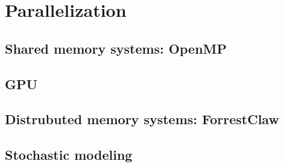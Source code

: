 \chapter{Parallelization}\label{ChapParallel}
\section{Shared memory systems: OpenMP}\label{ChapParallelSecOpenMP}
\section{GPU}\label{ChapParallelSecGPU}
\section{Distrubuted memory systems: ForrestClaw}\label{ChapParallelSecForrest}
\section{Stochastic modeling}\label{ChapParallelStoc}

